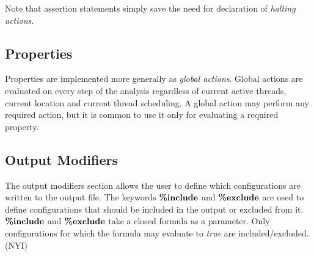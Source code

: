 Note that assertion statements simply save the need for
declaration of \emph{halting actions}.


\subsection{Properties}

Properties are implemented more generally as \emph{global
actions}. Global actions are evaluated on every step of the
analysis regardless of current active threads, current location
and current thread scheduling. A global action may perform any
required action, but it is common to use it only for evaluating a
required property.

\subsection{Output Modifiers}

The output modifiers section allows the user to define which
configurations are written to the output file. The keywords
$\textbf{\%include}$ and $\textbf{\%exclude}$ are used to define configurations
that should be included in the output or excluded from it.
$\textbf{\%include}$ and $\textbf{\%exclude}$ take a closed formula as a
parameter. Only configurations for which the formula may evaluate
to \emph{true} are included/excluded. (NYI)
